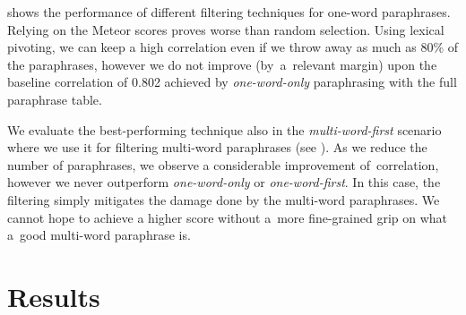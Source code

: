  shows the performance of different filtering
techniques for one-word paraphrases. Relying on the Meteor scores proves worse than
random selection. Using lexical pivoting, we can keep a high correlation even 
if we throw away as much as 80\% of the paraphrases, however we do not improve
(by~a~relevant margin) upon the baseline correlation of 0.802 achieved by
\emph{one-word-only} paraphrasing with the full paraphrase table.

We evaluate the best-performing technique also in the \textit{multi-word-first}
scenario where we use it for filtering multi-word paraphrases (see
). As we reduce the number of paraphrases, we observe a
considerable improvement of~correlation, however we never outperform
\textit{one-word-only} or \textit{one-word-first}. In this case, the filtering
simply mitigates the damage done by the multi-word paraphrases. We
cannot hope to achieve a higher score without a~more fine-grained grip on what
a~good multi-word paraphrase is.

\section{Results}
\label{results}

